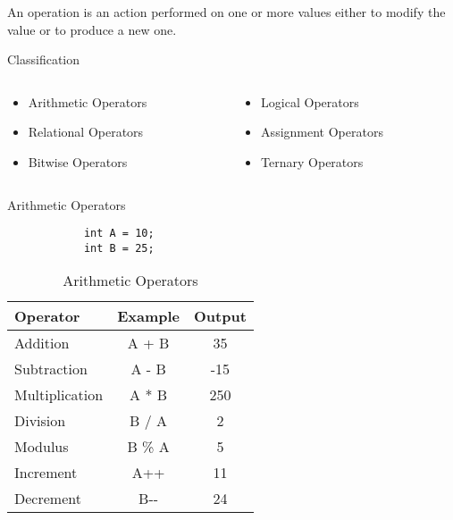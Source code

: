 \documentclass[10pt, compress]{beamer}
\begin{document}
\begin{slide}
	An operation is an action performed on one or more values either to modify the value or to produce a new one.
	\begin{block}{Classification}
		\begin{columns}
			\begin{column}{0.5\textwidth}
				\begin{itemize}
					\item[] Arithmetic Operators
					\item[] Relational Operators
					\item[] Bitwise Operators
				\end{itemize}
			\end{column}
			\begin{column}{0.5\textwidth}
				\begin{itemize}
					\item[] Logical Operators
					\item[] Assignment Operators
					\item[] Ternary Operators
				\end{itemize}
			\end{column}
		\end{columns}
	\end{block}
\end{slide}

\begin{slide}
	\begin{block}{Arithmetic Operators}
		\begin{verbatim}
			int A = 10;
			int B = 25;
		\end{verbatim}
		\begin{table}
			\begin{tabular}{lcc}
				\toprule
				Operator & Example & Output\\
				\midrule
				Addition & A + B & 35 \\
				Subtraction & A - B & -15\\
				Multiplication & A * B & 250\\
				Division & B / A & 2\\
				Modulus & B \% A & 5\\
				Increment & A++ & 11\\
				Decrement & B-{}- & 24\\
				\bottomrule
			\end{tabular}
			\caption{Arithmetic Operators}
		\end{table}
	\end{block}
\end{slide}
\end{document}
